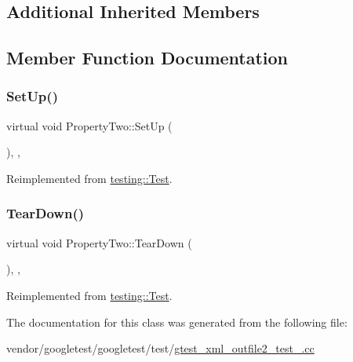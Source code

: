 \subsection*{Additional Inherited Members}


\subsection{Member Function Documentation}
\mbox{\label{class_property_two_aa3ab39cf4e6c751cb0788c575bf92ca2}} 
\subsubsection{\texorpdfstring{Set\+Up()}{SetUp()}}
{\footnotesize\ttfamily virtual void Property\+Two\+::\+Set\+Up (\begin{DoxyParamCaption}{ }\end{DoxyParamCaption})\hspace{0.3cm}{\ttfamily [inline]}, {\ttfamily [protected]}, {\ttfamily [virtual]}}



Reimplemented from \hyperlink{classtesting_1_1_test_a190315150c303ddf801313fd1a777733}{testing\+::\+Test}.

\mbox{\label{class_property_two_aa4ffb2b9dddeba69f0f9baf133f06ef2}} 
\subsubsection{\texorpdfstring{Tear\+Down()}{TearDown()}}
{\footnotesize\ttfamily virtual void Property\+Two\+::\+Tear\+Down (\begin{DoxyParamCaption}{ }\end{DoxyParamCaption})\hspace{0.3cm}{\ttfamily [inline]}, {\ttfamily [protected]}, {\ttfamily [virtual]}}



Reimplemented from \hyperlink{classtesting_1_1_test_a5f0ab439802cbe0ef7552f1a9f791923}{testing\+::\+Test}.



The documentation for this class was generated from the following file\+:\begin{DoxyCompactItemize}
\item 
vendor/googletest/googletest/test/\hyperlink{gtest__xml__outfile2__test___8cc}{gtest\+\_\+xml\+\_\+outfile2\+\_\+test\+\_\+.\+cc}\end{DoxyCompactItemize}
